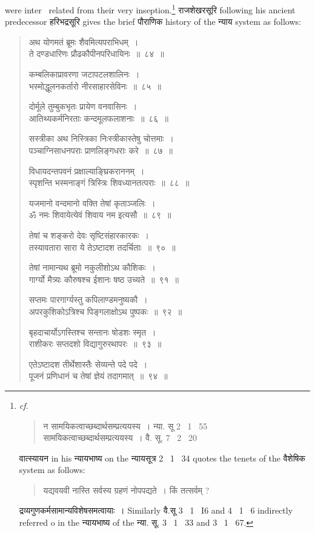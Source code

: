 \documentclass[11pt, openany]{book}
\begin{document}
\newpage
\noindent
were inter \textendash\ related from their very inseption.\renewcommand{\thefootnote}{1}\footnote{{\en \textit{cf.}}

\begin{quote}
{\qt न सामयिकत्वाच्छब्दार्थसम्प्रत्ययस्य~। न्या. सू 2 \textendash\ 1 \textendash\ 55\\
सामयिकत्वाच्छब्दार्थसम्प्रत्ययस्य~। वै. सू. 7 \textendash\ 2 \textendash\ 20}
\end{quote}

वात्स्यायन in his न्यायभाष्य on the न्यायसूत्र 2 \textendash\ 1 \textendash\ 34 quotes the tenets of the वैशेषिक system as follows:\textendash

\begin{quote}
{\qt यद्यवयवी नास्ति सर्वस्य ग्रहणं नोपपद्यते~। किं तत्सर्वम् ?}
\end{quote}

\noindent
द्रव्यगुणकर्मसामान्यविशेषसमत्वायाः~। Similarly वै.सू 3 \textendash\ 1 \textendash\ I6 and 4 \textendash\ 1 \textendash\ 6 indirectly referred o in the न्यायभाष्य of the न्या. सू. 3 \textendash\ 1 \textendash\ 33 and 3 \textendash\ 1 \textendash\ 67.} राजशेखरसूरि following his ancient predecessor हरिभद्रसूरि gives the brief पौराणिक history of the न्याय system as follows:

\begin{quote}
{\knui अथ योगमतं ब्रूमः शैवमित्यपराभिधम्~।\\
ते दण्डधारिणः प्रौढकौपीनपरिधायिनः~॥~८४~॥

कम्बलिकाप्रावरणा जटापटलशालिनः~।\\
भस्मोद्धूलनकर्तारो नीरसाहारसेविनः~॥~८५~॥

दोर्मूले तुम्बुकभृतः प्रायेण वनवासिनः~।\\
आतिथ्यकर्मनिरताः कन्दमूलफलाशनाः~॥~८६~॥

सस्त्रीका अथ निस्त्रिका निःस्त्रीकास्तेषु चोत्तमाः~।\\
पञ्चाग्निसाधनपराः प्राणलिङ्गधराः करे~॥~८७~॥

विधायदन्तपवनं प्रक्षाल्याङ्घ्रिकराननम्~।\\
स्पृशन्ति भस्मनाङ्गं त्रिस्त्रिः शिवध्यानतत्पराः~॥~८८~॥

यजमानो वन्दमानो वक्ति तेषां कृताञ्जलिः~।\\
ॐ नमः शिवायेत्येवं शिवाय नम इत्यसौ~॥~८९~॥

तेषां च शङ्करो देवः सृष्टिसंहारकारकः~।\\
तस्यावतारा सारा ये तेऽष्टादश तदर्चिताः~॥~९०~॥

तेषां नामान्यथ ब्रूमो नकुलीशोऽथ कौशिकः~।\\
गार्ग्यो मैत्र्यः कौरुषश्च ईशानः षष्ठ उच्यते~॥~९१~॥

सप्तमः पारगार्ग्यस्तु कपिलाण्डमनुष्यकौ~।\\
अपरकुशिकोऽत्रिश्च पिङ्गलाक्षोऽथ पुष्पकः~॥~९२~॥

बृहदाचार्योऽगस्तिश्च सन्तानः षोडशः स्मृत~।\\
राशीकरः सप्तदशो विद्यागुरुरथापरः~॥~९३~॥

 एतेऽष्टादश तीर्थेशास्तैः सेव्यन्ते पदे पदे~।\\
पूजनं प्रणिधानं च तेषां ज्ञेयं तदागमात्~॥~९४~॥}
\end{quote}
\end{document}

